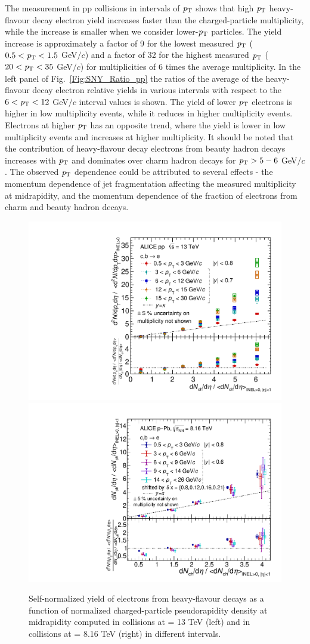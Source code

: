 The measurement in pp collisions in intervals of ${\it p}_{\rm T}$ shows that high ${\it p}_{\rm T}$ heavy-flavour decay electron yield increases faster than the charged-particle multiplicity, while the
increase is smaller when we consider lower-${\it p}_{\rm T}$ particles. The yield increase is approximately a factor of 9 for the lowest measured ${\it p}_{\rm T}$ ($0.5 < {\it p}_{\rm T} < 1.5$ GeV$/c$) and a factor of 32 for the highest measured ${\it p}_{\rm T}$ ($20 < {\it p}_{\rm T} < 35$ GeV$/c$) for multiplicities of 6 times the average multiplicity. In the left panel of Fig.~\ref{Fig:SNY_Ratio_pp} the ratios of the average of the heavy-flavour decay electron relative yields in various \pt
intervals with respect to the $6 < {\it p}_{\rm T} < 12$ GeV$/c$ interval values is shown. The yield of lower ${\it p}_{\rm T}$ electrons is higher in low  multiplicity events, while it reduces in higher multiplicity events. Electrons at higher ${\it p}_{\rm T}$ has an opposite trend, where the yield is lower in low  multiplicity events and increases at higher multiplicity. It should be noted that the contribution of heavy-flavour decay electrons from beauty hadron decays increases with ${\it p}_{\rm T}$ and dominates over charm hadron decays for ${\it p}_{\rm T} > 5-6$ GeV$/c$.  The observed ${\it p}_{\rm T}$ dependence could be attributed to several effects - the momentum dependence of jet fragmentation affecting the measured multiplicity at midrapidity, and the momentum dependence of the fraction of electrons from charm and beauty hadron decays. 


\begin{figure}[!ht]
\includegraphics[width=0.46\linewidth]{figures/Results/HFE_ppNormalB/SNY_diagonal.pdf}
\hfil
\includegraphics[width=0.46\linewidth]{figures/Results/HFE_pPb/HFESelfNormalieYieldFullpT.pdf}
\caption{Self-normalized yield of electrons from heavy-flavour decays as a function of normalized charged-particle pseudorapidity density at midrapidity computed in \pp collisions at \sqrts = 13 TeV (left) and in \pPb collisions at \sqrtsNN = 8.16 TeV (right) in different \pt intervals.}
\label{Fig:SelfnormalizedYield}
\end{figure}


